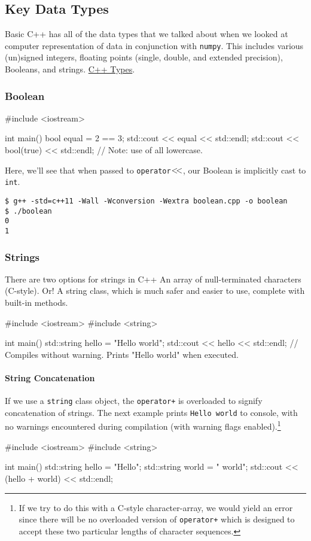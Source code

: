 \documentclass[12pt,letterpaper,twoside]{article}
\begin{document}
\subsection{Key Data Types}
Basic C++ has all of the data types that we talked about when we looked at
computer representation of data in conjunction with \texttt{numpy}. This includes
various (un)signed integers,
floating points (single, double,
and extended precision), Booleans, and
strings. \href{https://en.cppreference.com/w/cpp/language/type}{C++ Types}.

\subsubsection{Boolean}
\begin{cpp}
#include <iostream>

int main() {
  bool equal = 2 == 3;
  std::cout << equal << std::endl;
  std::cout << bool(true) << std::endl;  // Note: use of all lowercase.
}
\end{cpp}

Here, we'll see that when passed to
\texttt{operator$<\hspace{-2pt}<$}, our Boolean is implicitly
cast to \texttt{int}.
\begin{verbatim}
$ g++ -std=c++11 -Wall -Wconversion -Wextra boolean.cpp -o boolean
$ ./boolean
0
1
\end{verbatim}

\vspace{-3ex}
\subsubsection{Strings}
There are two options for strings in C++
An array of null-terminated characters (C-style). Or! 
A string class, which is much safer and easier to use, complete with
built-in methods.

\begin{cpp}
#include <iostream>
#include <string>

int main() {
  std::string hello = "Hello world";
  std::cout << hello << std::endl;    // Compiles without warning. Prints "Hello world" when executed.
}
\end{cpp}

\paragraph{String Concatenation}
If we use a \texttt{string} class object, the \texttt{operator+} is
overloaded to signify concatenation of strings. The next example
prints \texttt{Hello world} to console, with no warnings encountered
during compilation (with warning flags enabled).\footnote{If we try to do this with a C-style character-array, we would
yield an error since there will be no overloaded version of
\texttt{operator+} which is designed to accept these two particular
lengths of character sequences.
}
\begin{cpp}
#include <iostream>
#include <string>

int main() {
  std::string hello = "Hello";
  std::string world = " world";
  std::cout << (hello + world) << std::endl;
}
\end{cpp}
\end{document}
